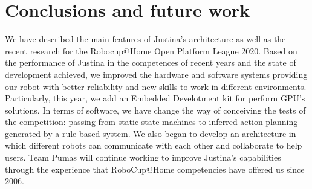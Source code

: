 \documentclass{llncs}
\begin{document}

\section{Conclusions and future work}\label{sec:conclusions}
We have described the main features of Justina's architecture as well as the recent research for the Robocup@Home Open Platform League 2020. Based on the performance of Justina in the competences of recent years and the state of development achieved, we improved the hardware and software systems providing our robot with better reliability and new skills to work in different environments. 
Particularly, this year, we add an Embedded Develotment kit \cite{jetson} for perform GPU's solutions.
In terms of software, we have change the way of conceiving the tests of the competition: passing from static state machines to inferred action planning generated by a rule based system.
We also began to develop an architecture in which different robots can communicate with each other and collaborate to help users.
Team Pumas will continue working to improve Justina's capabilities through the experience that RoboCup@Home competencies have offered us since 2006.




\end{document}
